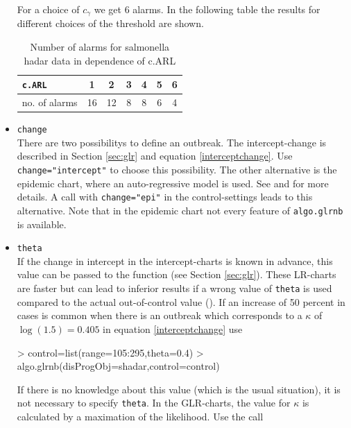 \documentclass[a4paper,11pt]{article}
\begin{document}
\begin{itemize}
For a choice of $c_{\gamma}$ we get  6 alarms. In the following table the results for different choices of the threshold are shown.


\begin{table}[h]
\begin{center}
\caption{Number of alarms for salmonella hadar data in dependence of c.ARL}
\label{c.ARL}
\begin{tabular}{l|cccccc}
\verb+c.ARL+ & 1 & 2 & 3 & 4 & 5 & 6 \\
\hline
no. of alarms & 16 & 12 & 8 & 8 & 6 & 4
\end{tabular}
\end{center}
\end{table}





\item \verb+change+ \\
There are two possibilitys to define an outbreak. The intercept-change is described in Section \ref{sec:glr} and equation \ref{interceptchange}. Use \verb+change="intercept"+ to choose this possibility. The other alternative is the epidemic chart, where an auto-regressive model is used. See \citet{held2005} and \citet{hoehle2008} for more details. A call with \verb+change="epi"+ in the control-settings leads to this alternative. Note that in the epidemic chart not every feature of \verb+algo.glrnb+ is available. 

\item \verb+theta+ \\
If the change in intercept in the intercept-charts is known in advance, this value can be passed to the function (see Section \ref{sec:glr}). These LR-charts are faster but can lead to inferior results if a wrong value of \verb+theta+ is used compared to the actual out-of-control value (\citet{hoehle2008}). If  an increase of 50 percent in cases is common when there is an outbreak which corresponds to a $\kappa$ of $\log(1.5)=0.405$ in equation \ref{interceptchange} use

\begin{Schunk}
\begin{Sinput}
> control=list(range=105:295,theta=0.4)
> algo.glrnb(disProgObj=shadar,control=control)
\end{Sinput}
\end{Schunk}

If there is no knowledge about this value (which is the usual situation), it is not necessary to specify \verb+theta+. In the GLR-charts, the value for $\kappa$ is calculated by a maximation of the likelihood. Use the call   


\end{itemize}
\end{document}
